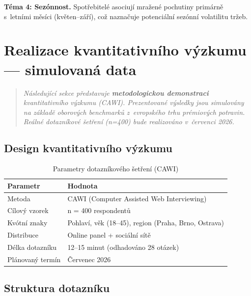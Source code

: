 \textbf{Téma 4: Sezónnost.} Spotřebitelé asociují mražené pochutiny primárně s~letními měsíci (květen--září), což naznačuje potenciální sezónní volatilitu tržeb.

\section{Realizace kvantitativního výzkumu — simulovaná data}
\label{sec:res_quantitative}

\begin{quote}
\textit{Následující sekce představuje \textbf{metodologickou demonstraci} kvantitativního výzkumu (CAWI). Prezentované výsledky jsou simulovány na základě oborových benchmarků z~evropského trhu prémiových potravin. Reálné dotazníkové šetření (n=400) bude realizováno v~červenci 2026.}
\end{quote}

\subsection{Design kvantitativního výzkumu}

\begin{table}[H]
\centering
\caption{Parametry dotazníkového šetření (CAWI)}
\label{tab:cawi_design}
\begin{tabular}{ll}
\toprule
\textbf{Parametr} & \textbf{Hodnota} \\
\midrule
Metoda & CAWI (Computer Assisted Web Interviewing) \\
Cílový vzorek & n = 400 respondentů \\
Kvótní znaky & Pohlaví, věk (18--45), region (Praha, Brno, Ostrava) \\
Distribuce & Online panel + sociální sítě \\
Délka dotazníku & 12--15 minut (odhadováno 28 otázek) \\
Plánovaný termín & Červenec 2026 \\
\bottomrule
\end{tabular}
\end{table}

\subsection{Struktura dotazníku}

